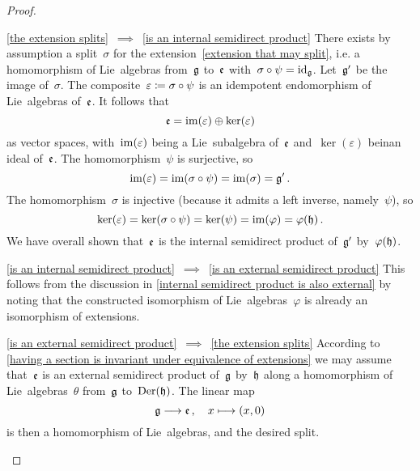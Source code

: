 \begin{proof}
	\leavevmode
	\begin{implicationlist}
		\item[\ref{the extension splits}~$\implies$~\ref{is an internal semidirect product}]
			There exists by assumption a split~$\sigma$ for the extension~\eqref{extension that may split}, i.e. a homomorphism of Lie~algebras from~$\mathfrak{g}$ to~$\mathfrak{e}$ with~$\sigma \circ \psi = \mathrm{id}_{\mathfrak{g}}$.
			Let~$\mathfrak{g}'$ be the image of~$\sigma$.
			The composite~$\varepsilon \coloneqq \sigma \circ \psi$ is an idempotent endomorphism of Lie~algebras of~$\mathfrak{e}$.
			It follows that
			\[
				\mathfrak{e}
				=
				\operatorname{im}(\varepsilon) \oplus \ker(\varepsilon)
			\]
			as vector spaces, with~$\operatorname{im}(\varepsilon)$ being a Lie~subalgebra of~$\mathfrak{e}$ and~$\ker(\varepsilon)$ beinan ideal of~$\mathfrak{e}$.
			The homomorphism~$\psi$ is surjective, so
			\[
				\operatorname{im}(\varepsilon)
				=
				\operatorname{im}(\sigma \circ \psi)
				=
				\operatorname{im}(\sigma)
				=
				\mathfrak{g}' \,.
			\]
			The homomorphism~$\sigma$ is injective (because it admits a left inverse, namely~$\psi$), so
			\[
				\ker(\varepsilon)
				=
				\ker(\sigma \circ \psi)
				=
				\ker(\psi)
				=
				\operatorname{im}(\varphi)
				=
				\varphi(\mathfrak{h}) \,.
			\]
			We have overall shown that~$\mathfrak{e}$ is the internal semidirect product of~$\mathfrak{g}'$ by~$\varphi(\mathfrak{h})$.
		\item[\ref{is an internal semidirect product}~$\implies$~\ref{is an external semidirect product}]
			This follows from the discussion in \cref{internal semidirect product is also external} by noting that the constructed isomorphism of Lie~algebras~$\varphi$ is already an isomorphism of extensions.
		\item[\ref{is an external semidirect product}~$\implies$~\ref{the extension splits}]
			According to \cref{having a section is invariant under equivalence of extensions} we may assume that~$\mathfrak{e}$ is an external semidirect product of~$\mathfrak{g}$ by~$\mathfrak{h}$ along a homomorphism of Lie~algebras~$\theta$ from~$\mathfrak{g}$ to~$\operatorname{Der}(\mathfrak{h})$.
			The linear map
			\[
				\glie
				\to
				\elie \,,
				\quad
				x
				\mapsto
				(x,0)
			\]
			is then a homomorphism of Lie~algebras, and the desired split.
		\qedhere
	\end{implicationlist}
\end{proof}


